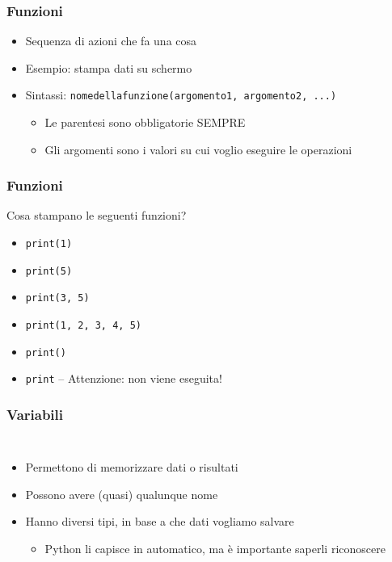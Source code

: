 \begin{contentframe}
    \frametitle{Funzioni}

    \begin{itemize}
        \item Sequenza di azioni che fa una cosa

        \bigskip
        \item Esempio:  stampa dati su schermo

        \bigskip
        \item Sintassi: \texttt{nomedellafunzione(argomento1, argomento2, ...)}
        \begin{itemize}
            \item Le parentesi sono obbligatorie SEMPRE
            \item Gli argomenti sono i valori su cui voglio eseguire le operazioni
        \end{itemize}
    \end{itemize}
\end{contentframe}

\begin{exerciseframe}
    \frametitle{Funzioni}

    Cosa stampano le seguenti funzioni?
    \begin{itemize}
        \item \texttt{print(1)}\pause
        \item \texttt{print(5)}\pause
        \item \texttt{print(3, 5)}\pause
        \item \texttt{print(1, 2, 3, 4, 5)}\pause
        \item \texttt{print()}\pause
        \item \texttt{print}\pause{} -- Attenzione: non viene eseguita!
    \end{itemize}
\end{exerciseframe}

\begin{contentframe}
    \frametitle{Variabili}

    \begin{columns}
        \begin{itemize}
            \item Permettono di memorizzare dati o risultati

            \bigskip
            \item Possono avere (quasi) qualunque nome
            
            \bigskip
            \item Hanno diversi tipi, in base a che dati vogliamo salvare
            \begin{itemize}
                \item Python li capisce in automatico, ma è importante saperli riconoscere
            \end{itemize}
        \end{itemize}
        
        \centering
    \end{columns}
\end{contentframe}

